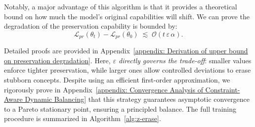 Notably, a major advantage of this algorithm is that it provides a theoretical bound on how much the model's original capabilities will shift. We can prove the degradation of the preservation capability is bounded by:
\begin{equation}
\label{eq: Lpr is bounded by}
    \mathcal{L}_{pr}(\theta_t)-\mathcal{L}_{pr}(\theta_0) \;\lesssim\; \mathcal{O}(t\,\varepsilon\,\alpha).
\end{equation}

Detailed proofs are provided in Appendix~\ref{appendix: Derivation of upper bound on preservation degradation}. Here, \emph{$\varepsilon$ directly governs the trade-off}: smaller values enforce tighter preservation, while larger ones allow controlled deviations to erase stubborn concepts. Despite using an efficient first-order approximation, we rigorously prove in Appendix~\ref{appendix: Convergence Analysis of Constraint-Aware Dynamic Balancing} that this strategy guarantees asymptotic convergence to a Pareto stationary point, ensuring a principled balance. The full training procedure is summarized in Algorithm~\ref{alg:z-erase}.